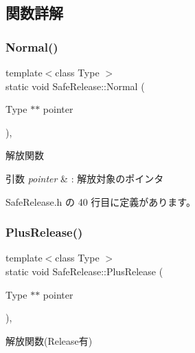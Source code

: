 \subsection{関数詳解}
\mbox{\label{class_safe_release_a6ecab682df939c28d8867a67c2f4b51f}} 
\subsubsection{\texorpdfstring{Normal()}{Normal()}}
{\footnotesize\ttfamily template$<$class Type $>$ \\
static void Safe\+Release\+::\+Normal (\begin{DoxyParamCaption}\item[{Type $\ast$$\ast$}]{pointer }\end{DoxyParamCaption})\hspace{0.3cm}{\ttfamily [inline]}, {\ttfamily [static]}}



解放関数 


\begin{DoxyParams}{引数}
{\em pointer} & \+: 解放対象のポインタ \\
\hline
\end{DoxyParams}


 Safe\+Release.\+h の 40 行目に定義があります。

\mbox{\label{class_safe_release_a507950335a85da67c1722cce83dca9ae}} 
\subsubsection{\texorpdfstring{Plus\+Release()}{PlusRelease()}}
{\footnotesize\ttfamily template$<$class Type $>$ \\
static void Safe\+Release\+::\+Plus\+Release (\begin{DoxyParamCaption}\item[{Type $\ast$$\ast$}]{pointer }\end{DoxyParamCaption})\hspace{0.3cm}{\ttfamily [inline]}, {\ttfamily [static]}}



解放関数(Release有) 



